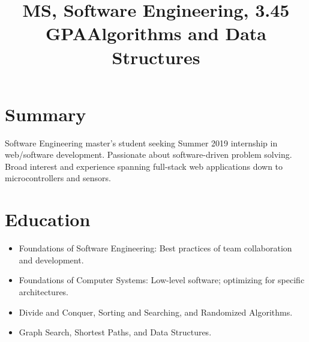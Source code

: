\documentclass[12pt]{res} %
\begin{document}
    \begin{resume}
 
      \section{Summary}
      Software Engineering master's student seeking Summer 2019 internship in web/software development.
      Passionate about software-driven problem solving.
      Broad interest and experience spanning full-stack web applications down to microcontrollers and sensors.
      \vspace{-12pt}

      \section{Education}

          \title{\textbf{MS, Software Engineering, 3.45 GPA}}
          \begin{position}
              \vspace{-14pt}
              \begin{itemize}[leftmargin=-0.4cm]
              \itemsep0em
              \item Foundations of Software Engineering: Best practices of team collaboration and development.
              \item Foundations of Computer Systems: Low-level software; optimizing for specific architectures.
              \end{itemize}
          \end{position}
          \vspace{-12pt}

          \title{\textbf{Algorithms and Data Structures}}
          \begin{position}
              \vspace{-14pt}
              \begin{itemize}[leftmargin=-0.4cm]
              \itemsep0em
              \item Divide and Conquer, Sorting and Searching, and Randomized Algorithms.
              \item Graph Search, Shortest Paths, and Data Structures.
              \end{itemize}
          \end{position}
          \vspace{-12pt}


\end{resume}
\end{document}
